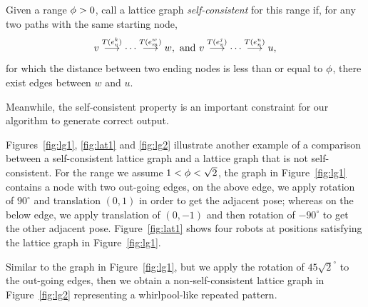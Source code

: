 \begin{defn}
  \label{def:selfconsistent}
  Given a range $\phi > 0$, call a lattice graph \textit{self-consistent} for
  this range if, for any two paths with the same starting node,
  $$ {v}\overset{T(e_v^{k})}{\longrightarrow}{\cdots}\overset{T(e_m^{w})}{\longrightarrow}{w}, \mbox{ and } 
    {v}\overset{T(e_v^{j})}{\longrightarrow}{\cdots}\overset{T(e_n^{u})}{\longrightarrow}{u}, $$
  for which the distance between two ending nodes is less than or equal to
  $\phi$, there exist edges between $w$ and $u$.
\end{defn}


\begin{figure}
    \centering
    
    \label{fig:self-consistent-graph}
\end{figure}


Meanwhile, the self-consistent property is an important constraint for our algorithm to generate correct output.

\begin{figure}
    \centering
    
\end{figure}

Figures~\ref{fig:lg1}, \ref{fig:lat1} and \ref{fig:lg2} illustrate another example of a comparison between a self-consistent lattice graph and a lattice graph that is not self-consistent. 
%
For the range we assume $1 < \phi < \sqrt{2}$, 
the graph in Figure~\ref{fig:lg1} contains a node with two out-going edges, on the above edge, we apply rotation of $90^{\circ}$ and translation $(0, 1)$ in order to get the adjacent pose; whereas on the below edge, we apply translation of $(0, -1)$ and then rotation of $-90^{\circ}$ to get the other adjacent pose. 
%
Figure~\ref{fig:lat1} shows four robots at positions satisfying the
lattice graph in Figure~\ref{fig:lg1}. 

Similar to the graph in Figure~\ref{fig:lg1}, but we apply the rotation of $45\sqrt{2}^{\circ}$ to the out-going edges, then we obtain a non-self-consistent lattice graph in Figure~\ref{fig:lg2} representing a whirlpool-like repeated pattern.


